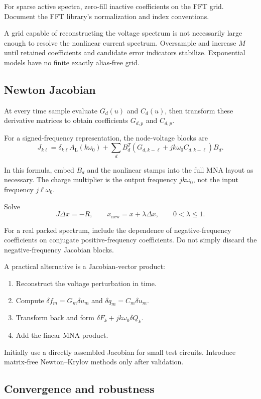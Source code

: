 \documentclass[11pt,a4paper]{article}
\begin{document}
For sparse active spectra, zero-fill inactive coefficients on the FFT
grid. Document the FFT library's normalization and index conventions.

A grid capable of reconstructing the voltage spectrum is not necessarily
large enough to resolve the nonlinear current spectrum. Oversample and
increase $M$ until retained coefficients and candidate error indicators
stabilize. Exponential models have no finite exactly alias-free grid.

\subsection{Newton Jacobian}

At every time sample evaluate $G_d(u)$ and $C_d(u)$, then transform
these derivative matrices to obtain coefficients $G_{d,p}$ and
$C_{d,p}$.

For a signed-frequency representation, the node-voltage blocks are
\[
 \boxed{
 J_{k\ell}
 =
 \delta_{k\ell}A_{\mathrm L}(k\omega_0)
 +\sum_d B_d^T
 \left(G_{d,k-\ell}+jk\omega_0C_{d,k-\ell}\right)B_d.
 }
\]

In this formula, embed $B_d$ and the nonlinear stamps into the full MNA
layout as necessary. The charge multiplier is the output frequency
$jk\omega_0$, not the input frequency $j\ell\omega_0$.

Solve
\[
 J\Delta x=-R,
 \qquad x_{\mathrm{new}}=x+\lambda\Delta x,
 \qquad 0<\lambda\leq1.
\]

For a real packed spectrum, include the dependence of negative-frequency
coefficients on conjugate positive-frequency coefficients. Do not simply
discard the negative-frequency Jacobian blocks.

A practical alternative is a Jacobian-vector product:
\begin{enumerate}
 \item Reconstruct the voltage perturbation in time.
 \item Compute $\delta f_m=G_m\delta u_m$ and
       $\delta q_m=C_m\delta u_m$.
 \item Transform back and form
       $\delta F_k+jk\omega_0\delta Q_k$.
 \item Add the linear MNA product.
\end{enumerate}

Initially use a directly assembled Jacobian for small test circuits.
Introduce matrix-free Newton--Krylov methods only after validation.

\subsection{Convergence and robustness}
\end{document}
